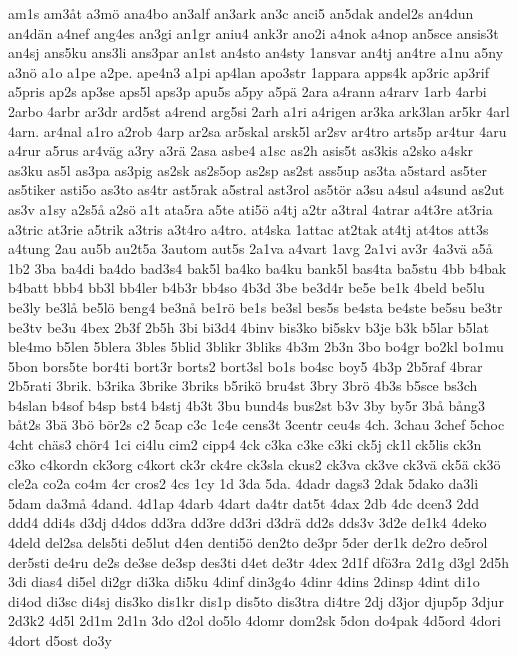 {am1s
am3^^e5t
a3m^^f6
ana4bo
an3alf
an3ark
an3c
anci5
an5dak
andel2s
an4dun
an4d^^e4n
a4nef
ang4es
an3gi
an1gr
aniu4
ank3r
ano2i
a4nok
a4nop
an5sce
ansis3t
an4sj
ans5ku
ans3li
ans3par
an1st
an4sto
an4sty
1ansvar
an4tj
an4tre
a1nu
a5ny
a3n^^f6
a1o
a1pe
a2pe.
ape4n3
a1pi
ap4lan
apo3str
1appara
apps4k
ap3ric
ap3rif
a5pris
ap2s
ap3se
aps5l
aps3p
apu5s
a5py
a5p^^e4
2ara
a4rann
a4rarv
1arb
4arbi
2arbo
4arbr
ar3dr
ard5st
a4rend
arg5si
2arh
a1ri
a4rigen
ar3ka
ark3lan
ar5kr
4arl
4arn.
ar4nal
a1ro
a2rob
4arp
ar2sa
ar5skal
arsk5l
ar2sv
ar4tro
arts5p
ar4tur
4aru
a4rur
a5rus
ar4v^^e4g
a3ry
a3r^^e4
2asa
asbe4
a1sc
as2h
asis5t
as3kis
a2sko
a4skr
as3ku
as5l
as3pa
as3pig
as2sk
as2s5op
as2sp
as2st
ass5up
as3ta
a5stard
as5ter
as5tiker
asti5o
as3to
as4tr
ast5rak
a5stral
ast3rol
as5t^^f6r
a3su
a4sul
a4sund
as2ut
as3v
a1sy
a2s5^^e5
a2s^^f6
a1t
ata5ra
a5te
ati5^^f6
a4tj
a2tr
a3tral
4atrar
a4t3re
at3ria
a3tric
at3rie
a5trik
a3tris
a3t4ro
a4tro.
at4ska
1attac
at2tak
at4tj
at4tos
att3s
a4tung
2au
au5b
au2t5a
3autom
aut5s
2a1va
a4vart
1avg
2a1vi
av3r
4a3v^^e4
a5^^e5
1b2
3ba
ba4di
ba4do
bad3s4
bak5l
ba4ko
ba4ku
bank5l
bas4ta
ba5stu
4bb
b4bak
b4batt
bbb4
bb3l
bb4ler
b4b3r
bb4so
4b3d
3be
be3d4r
be5e
be1k
4beld
be5lu
be3ly
be3l^^e5
be5l^^f6
beng4
be3n^^e5
be1r^^f6
be1s
be3sl
bes5s
be4sta
be4ste
be5su
be3tr
be3tv
be3u
4bex
2b3f
2b5h
3bi
bi3d4
4binv
bis3ko
bi5skv
b3je
b3k
b5lar
b5lat
ble4mo
b5len
5blera
3bles
5blid
3blikr
3bliks
4b3m
2b3n
3bo
bo4gr
bo2kl
bo1mu
5bon
bors5te
bor4ti
bort3r
borts2
bort3sl
bo1s
bo4sc
boy5
4b3p
2b5raf
4brar
2b5rati
3brik.
b3rika
3brike
3briks
b5rik^^f6
bru4st
3bry
3br^^f6
4b3s
b5sce
bs3ch
b4slan
b4sof
b4sp
bst4
b4stj
4b3t
3bu
bund4s
bus2st
b3v
3by
by5r
3b^^e5
b^^e5ng3
b^^e5t2s
3b^^e4
3b^^f6
b^^f6r2s
c2
5cap
c3c
1c4e
cens3t
3centr
ceu4s
4ch.
3chau
3chef
5choc
4cht
ch^^e4s3
ch^^f6r4
1ci
ci4lu
cim2
cipp4
4ck
c3ka
c3ke
c3ki
ck5j
ck1l
ck5lis
ck3n
c3ko
c4kordn
ck3org
c4kort
ck3r
ck4re
ck3sla
ckus2
ck3va
ck3ve
ck3v^^e4
ck5^^e4
ck3^^f6
cle2a
co2a
co4m
4cr
cros2
4cs
1cy
1d
3da
5da.
4dadr
dags3
2dak
5dako
da3li
5dam
da3m^^e5
4dand.
4d1ap
4darb
4dart
da4tr
dat5t
4dax
2db
4dc
dcen3
2dd
ddd4
ddi4s
d3dj
d4dos
dd3ra
dd3re
dd3ri
d3dr^^e4
dd2s
dds3v
3d2e
de1k4
4deko
4deld
del2sa
dels5ti
de5lut
d4en
denti5^^f6
den2to
de3pr
5der
der1k
de2ro
de5rol
der5sti
de4ru
de2s
de3se
de3sp
des3ti
d4et
de3tr
4dex
2d1f
df^^f63ra
2d1g
d3gl
2d5h
3di
dias4
di5el
di2gr
di3ka
di5ku
4dinf
din3g4o
4dinr
4dins
2dinsp
4dint
di1o
di4od
di3sc
di4sj
dis3ko
dis1kr
dis1p
dis5to
dis3tra
di4tre
2dj
d3jor
djup5p
3djur
2d3k2
4d5l
2d1m
2d1n
3do
d2ol
do5lo
4domr
dom2sk
5don
do4pak
4d5ord
4dori
4dort
d5ost
do3y
}
